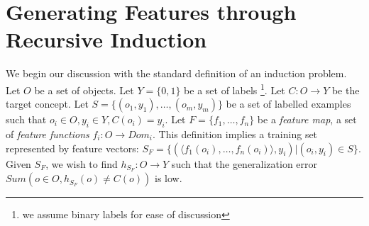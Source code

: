 \documentclass[twoside,11pt]{article}
\theoremstyle{definition}
\begin{document}


\section{Generating Features through Recursive Induction}

We begin our discussion with the standard definition of an induction problem. 
Let $O$ be a set of objects. Let $Y=\{0,1\}$ be a set of labels \footnote{we assume binary labels for ease of discussion}. Let $C:O\rightarrow Y$ be the target concept. Let $S=\{(o_{1},y_{1}),\ldots,(o_{m},y_{m})\}$ be a set of labelled examples such that $o_{i}\in O, y_{i}\in Y, C(o_i)=y_i$. 
Let $F=\{f_{1},\ldots,f_{n}\}$ be a \emph{feature map}, a set of \emph{feature functions} $f_{i}:O\rightarrow Dom_{i}$.  This definition implies a training set represented by feature vectors: $S_F=\{ (\langle f_1(o_i),\ldots,f_n(o_i)\rangle, y_i) | (o_i,y_i) \in S\}$.
Given $S_F$, we wish to find $h_{S_F}:O\rightarrow Y$ such that the generalization error $Sum(o\in O,h_{S_F}(o)\neq C(o))$ is low.
\end{document}
